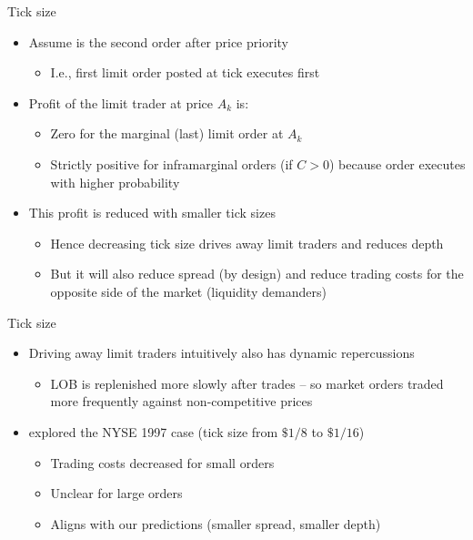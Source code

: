 \documentclass[english,10pt]{beamer}
\begin{document}
\begin{frame}{Tick size}
	\begin{itemize}
		\item Assume  is the second order after price priority
		\begin{itemize}
			\item I.e., first limit order posted at tick executes first
		\end{itemize}
		\item Profit of the limit trader at price $A_k$ is:
		\begin{itemize}
			\item Zero for the marginal (last) limit order at $A_k$
			\item Strictly positive for inframarginal orders (if $C>0$) because order executes with higher probability
		\end{itemize}
		\item This profit is reduced with \alert{smaller tick sizes}
		\begin{itemize}
			\item Hence decreasing tick size drives away limit traders and reduces depth
			\item But it will also reduce spread (by design) and reduce trading costs for the opposite side of the market (liquidity demanders)
		\end{itemize}
	\end{itemize}
\end{frame}


\begin{frame}{Tick size}
	\begin{itemize}
		\item Driving away limit traders intuitively also has dynamic repercussions
		\begin{itemize}
			\item LOB is replenished more slowly after trades -- so market orders traded more frequently against non-competitive prices
		\end{itemize}
		\item \cite{goldstein_eighths_2000} explored the NYSE 1997 case (tick size from $\$1/8$ to $\$1/16$)
		\begin{itemize}
			\item Trading costs decreased for small orders
			\item Unclear for large orders
			\item Aligns with our predictions (smaller spread, smaller depth)
		\end{itemize}
	\end{itemize}
\end{frame}
\end{document}
